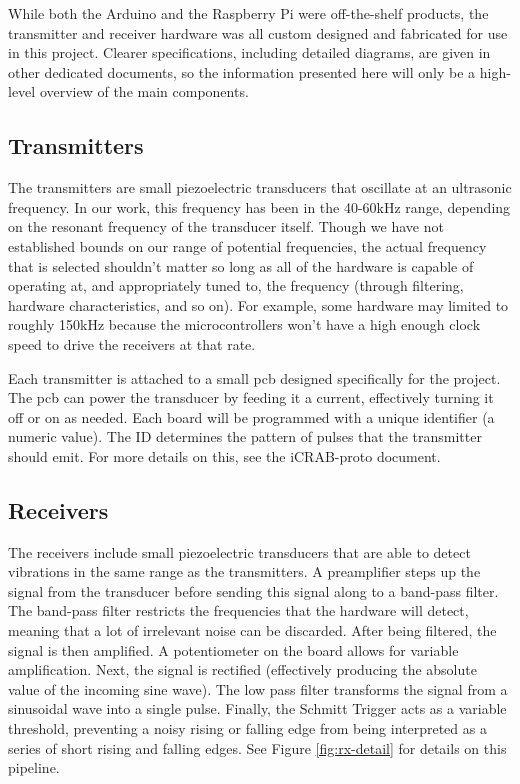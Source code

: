 \documentclass[12pt]{article}
\begin{document}
While both the Arduino and the Raspberry Pi were off-the-shelf products,
the transmitter and receiver hardware was all custom designed and fabricated
for use in this project.
Clearer specifications, including detailed diagrams, are given in other
dedicated documents, so the information presented here will only be a
high-level overview of the main components.

\subsection{Transmitters}

The transmitters are small piezoelectric transducers that oscillate at an
ultrasonic frequency.
In our work, this frequency has been in the 40-60kHz range, depending on the
resonant frequency of the transducer itself.
Though we have not established bounds on our range of potential frequencies,
the actual frequency that is selected shouldn't matter so long as all of the
hardware is capable of operating at, and
appropriately tuned to, the frequency (through filtering,
hardware characteristics, and so on).
For example, some hardware may limited to roughly 150kHz because the
microcontrollers won't have a high enough clock speed to drive
the receivers at that rate.

Each transmitter is attached to a small \gls{pcb} designed
specifically for the project.
The \gls{pcb} can power the transducer by feeding it a current, effectively
turning it off or on as needed.
Each board will be programmed with a unique identifier (a numeric value).
The ID determines the pattern of pulses that the transmitter should emit.
For more details on this, see the \gls{iCRAB-proto} document.

\subsection{Receivers}

The receivers include small piezoelectric transducers that are able to detect
vibrations in the same range as the transmitters.
A preamplifier steps up the signal from the transducer before sending this
signal along to a band-pass filter.
The band-pass filter restricts the frequencies that the hardware will
detect, meaning that a lot of irrelevant noise can be discarded.
After being filtered, the signal is then amplified.
A potentiometer on the board allows for variable amplification.
Next, the signal is
rectified (effectively producing the absolute value of the incoming sine wave).
The low pass filter transforms the signal from a sinusoidal wave into a single
pulse.
Finally, the Schmitt Trigger acts as a variable threshold, preventing a noisy
rising or falling edge from being interpreted as a series of short rising and
falling edges.
See Figure \ref{fig:rx-detail} for details on this pipeline.
\end{document}
